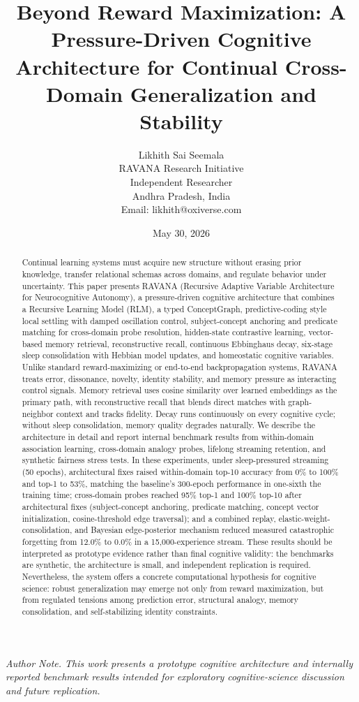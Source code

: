 \documentclass[11pt]{article}
\title{Beyond Reward Maximization: A Pressure-Driven Cognitive Architecture for Continual Cross-Domain Generalization and Stability}
\author{Likhith Sai Seemala\\RAVANA Research Initiative\\Independent Researcher\\Andhra Pradesh, India\\Email: likhith@oxiverse.com}
\date{May 30, 2026}
\begin{document}
\maketitle

\begin{center}
\textit{Author Note. This work presents a prototype cognitive architecture and internally reported benchmark results intended for exploratory cognitive-science discussion and future replication.}
\end{center}

\begin{abstract}
Continual learning systems must acquire new structure without erasing prior knowledge, transfer relational schemas across domains, and regulate behavior under uncertainty. This paper presents RAVANA (Recursive Adaptive Variable Architecture for Neurocognitive Autonomy), a pressure-driven cognitive architecture that combines a Recursive Learning Model (RLM), a typed ConceptGraph, predictive-coding style local settling with damped oscillation control, subject-concept anchoring and predicate matching for cross-domain probe resolution, hidden-state contrastive learning, vector-based memory retrieval, reconstructive recall, continuous Ebbinghaus decay, six-stage sleep consolidation with Hebbian model updates, and homeostatic cognitive variables. Unlike standard reward-maximizing or end-to-end backpropagation systems, RAVANA treats error, dissonance, novelty, identity stability, and memory pressure as interacting control signals. Memory retrieval uses cosine similarity over learned embeddings as the primary path, with reconstructive recall that blends direct matches with graph-neighbor context and tracks fidelity. Decay runs continuously on every cognitive cycle; without sleep consolidation, memory quality degrades naturally. We describe the architecture in detail and report internal benchmark results from within-domain association learning, cross-domain analogy probes, lifelong streaming retention, and synthetic fairness stress tests. In these experiments, under sleep-pressured streaming (50 epochs), architectural fixes raised within-domain top-10 accuracy from 0\% to 100\% and top-1 to 53\%, matching the baseline's 300-epoch performance in one-sixth the training time; cross-domain probes reached 95\% top-1 and 100\% top-10 after architectural fixes (subject-concept anchoring, predicate matching, concept vector initialization, cosine-threshold edge traversal); and a combined replay, elastic-weight-consolidation, and Bayesian edge-posterior mechanism reduced measured catastrophic forgetting from 12.0\% to 0.0\% in a 15,000-experience stream. These results should be interpreted as prototype evidence rather than final cognitive validity: the benchmarks are synthetic, the architecture is small, and independent replication is required. Nevertheless, the system offers a concrete computational hypothesis for cognitive science: robust generalization may emerge not only from reward maximization, but from regulated tensions among prediction error, structural analogy, memory consolidation, and self-stabilizing identity constraints.
\end{abstract}
\end{document}
